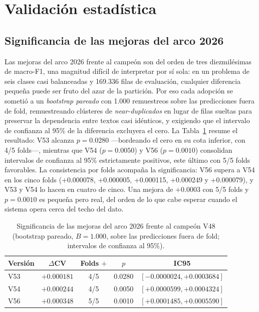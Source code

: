 \documentclass[journal]{IEEEtai}
\begin{document}
\section{Validaci\'on estad\'istica}

\subsection{Significancia de las mejoras del arco 2026}

Las mejoras del arco 2026 frente al campe\'on son del orden de tres diezmil\'esimas de macro-F1, una magnitud dif\'icil de interpretar por s\'i sola: en un problema de seis clases casi balanceadas y 169.336 filas de evaluaci\'on, cualquier diferencia peque\~na puede ser fruto del azar de la partici\'on. Por eso cada adopci\'on se someti\'o a un \emph{bootstrap pareado} con 1.000 remuestreos sobre las predicciones fuera de fold, remuestreando cl\'usteres de \textit{near-duplicados} en lugar de filas sueltas para preservar la dependencia entre textos casi id\'enticos, y exigiendo que el intervalo de confianza al 95\% de la diferencia excluyera el cero. La Tabla~\ref{tab:significancia} resume el resultado: V53 alcanza $p = 0.0280$ ---bordeando el cero en su cota inferior, con 4/5 folds---, mientras que V54 ($p = 0.0050$) y V56 ($p = 0.0010$) consolidan intervalos de confianza al 95\% estrictamente positivos, este \'ultimo con 5/5 folds favorables. La consistencia por folds acompa\~na la significancia: V56 supera a V54 en los cinco folds (+0.000078, +0.000005, +0.000115, +0.000249 y +0.000079), y V53 y V54 lo hacen en cuatro de cinco. Una mejora de $+0.0003$ con 5/5 folds y $p = 0.0010$ es peque\~na pero real, del orden de lo que cabe esperar cuando el sistema opera cerca del techo del dato.

\begin{table}[htbp]
\centering
\caption{Significancia de las mejoras del arco 2026 frente al campe\'on V48 (bootstrap pareado, $B = 1.000$, sobre las predicciones fuera de fold; intervalos de confianza al 95\%).}
\label{tab:significancia}
\footnotesize
\setlength{\tabcolsep}{3.5pt}
\begin{tabular}{lcccc}
\toprule
Versi\'on & $\Delta$CV & Folds $+$ & $p$ & IC95 \\
\midrule
V53 & $+0.000181$ & 4/5 & 0.0280 & $[-0.0000024,+0.0003684]$ \\
V54 & $+0.000244$ & 4/5 & 0.0050 & $[+0.0000599,+0.0004324]$ \\
V56 & $+0.000348$ & 5/5 & 0.0010 & $[+0.0001485,+0.0005590]$ \\
\bottomrule
\end{tabular}
\end{table}
\end{document}

